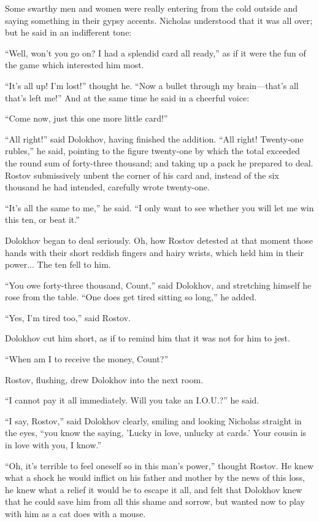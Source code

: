 Some swarthy men and women were really entering from the cold
outside and saying something in their gypsy accents. Nicholas
understood that it was all over; but he said in an indifferent
tone:

``Well, won't you go on? I had a splendid card all ready,'' as if
it were the fun of the game which interested him most.

``It's all up! I'm lost!'' thought he. ``Now a bullet through my
brain---that's all that's left me!'' And at the same time he said
in a cheerful voice:

``Come now, just this one more little card!''

``All right!'' said Dolokhov, having finished the addition. ``All
right!  Twenty-one rubles,'' he said, pointing to the figure
twenty-one by which the total exceeded the round sum of
forty-three thousand; and taking up a pack he prepared to
deal. Rostov submissively unbent the corner of his card and,
instead of the six thousand he had intended, carefully wrote
twenty-one.

``It's all the same to me,'' he said. ``I only want to see
whether you will let me win this ten, or beat it.''

Dolokhov began to deal seriously. Oh, how Rostov detested at that
moment those hands with their short reddish fingers and hairy
wrists, which held him in their power... The ten fell to him.

``You owe forty-three thousand, Count,'' said Dolokhov, and
stretching himself he rose from the table. ``One does get tired
sitting so long,'' he added.

``Yes, I'm tired too,'' said Rostov.

Dolokhov cut him short, as if to remind him that it was not for
him to jest.

``When am I to receive the money, Count?''

Rostov, flushing, drew Dolokhov into the next room.

``I cannot pay it all immediately. Will you take an I.O.U.?'' he
said.

``I say, Rostov,'' said Dolokhov clearly, smiling and looking
Nicholas straight in the eyes, ``you know the saying, 'Lucky in
love, unlucky at cards.' Your cousin is in love with you, I
know.''

``Oh, it's terrible to feel oneself so in this man's power,''
thought Rostov. He knew what a shock he would inflict on his
father and mother by the news of this loss, he knew what a relief
it would be to escape it all, and felt that Dolokhov knew that he
could save him from all this shame and sorrow, but wanted now to
play with him as a cat does with a mouse.

